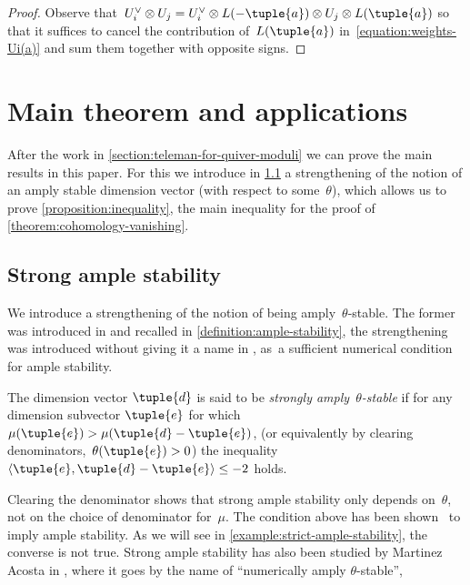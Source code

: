 \begin{proof}
Observe that~$U_i^\vee\otimes U_j=U_i^\vee\otimes L(-\tuple{a})\otimes U_j\otimes L(\tuple{a})$
so that it suffices to cancel the contribution of~$L(\tuple{a})$ in~\eqref{equation:weights-Ui(a)}
and sum them together with opposite signs.
\end{proof}

\section{Main theorem and applications}
\label{section:results}
After the work in \cref{section:teleman-for-quiver-moduli}
we can prove the main results in this paper.
For this we introduce in \cref{subsection:strong-ample-stability}
a strengthening of the notion of
an amply stable dimension vector (with respect to some~$\theta$),
which allows us to prove \cref{proposition:inequality},
the main inequality for the proof of \cref{theorem:cohomology-vanishing}.

\subsection{Strong ample stability}
\label{subsection:strong-ample-stability}
We introduce a strengthening of the notion of being amply~$\theta$-stable.
The former was introduced in \cite[Def.\,4.1]{MR3683503}
and recalled in \cref{definition:ample-stability},
the strengthening was introduced without giving it a name in \cite[Prop.\,5.1]{MR3683503}, as~a sufficient numerical condition for ample stability.
\begin{definition}
\label{definition:strong-ample-stability}
The dimension vector $\tuple{d}$ is said to be \emph{strongly amply~$\theta$-stable}
if for any dimension subvector $\tuple{e}$ for which $\mu(\tuple{e}) > \mu(\tuple{d} - \tuple{e})$,
(or equivalently by clearing denominators,~$\theta(\tuple{e})>0$)
the inequality $\langle \tuple{e}, \tuple{d} - \tuple{e} \rangle \leq -2$ holds.
\end{definition}
Clearing the denominator shows that strong ample stability only depends on~$\theta$,
not on the choice of denominator for~$\mu$.
The condition above has been shown~\cite[Prop.\,5.1]{MR3683503} to imply ample stability.
As we will see in \cref{example:strict-ample-stability}, the converse is not true.
Strong ample stability has also been studied by Martinez Acosta in \cite{karen},
where it goes by the name of ``numerically amply $\theta$-stable'',

